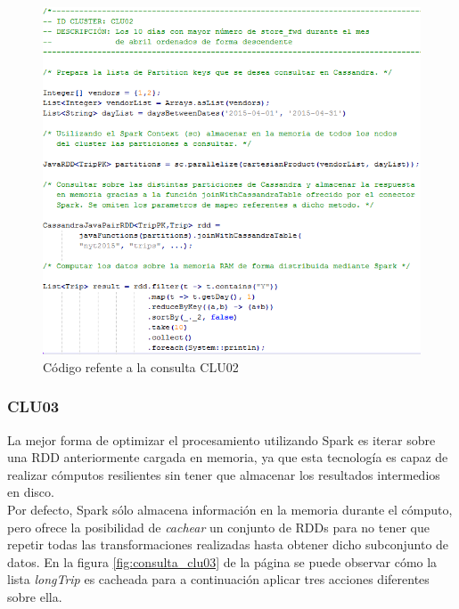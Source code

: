 \begin{figure}[h]
	\centering
	\includegraphics[width=1\textwidth]{Ilustraciones/CLU02.png}
	\caption{Código refente a la consulta CLU02}
	\label{fig:consulta_clu02}
\end{figure}

\clearpage

\subsubsection[]{CLU03}

La mejor forma de optimizar el procesamiento utilizando Spark es iterar sobre una RDD anteriormente cargada en memoria, ya que esta tecnología es capaz de realizar cómputos resilientes sin tener que almacenar los resultados intermedios en disco.\\

Por defecto, Spark sólo almacena información en la memoria durante el cómputo, pero ofrece la posibilidad de \textit{cachear} un conjunto de RDDs para no tener que repetir todas las transformaciones realizadas hasta obtener dicho subconjunto de datos. En la figura \ref{fig:consulta_clu03} de la página \pageref{fig:consulta_clu03} se puede observar cómo la lista \textit{longTrip} es cacheada para a continuación aplicar tres acciones diferentes sobre ella.\\

